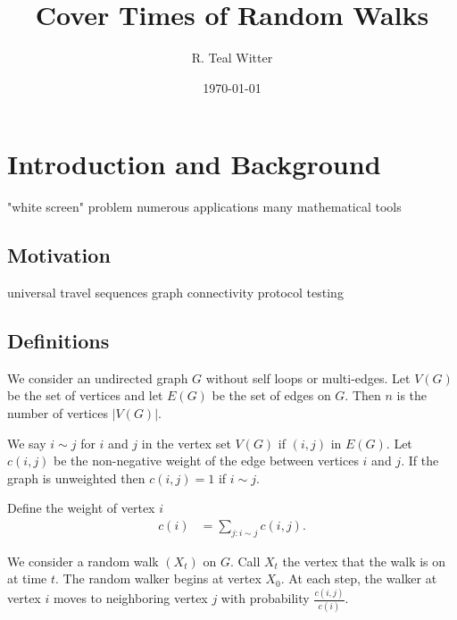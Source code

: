 \documentclass[12pt]{article}
\theoremstyle{definition}
\begin{document}
\title{Cover Times of Random Walks}


\author{R. Teal Witter}

\date{\today}



\maketitle


\newpage
\tableofcontents

\newpage
\section{Introduction and Background}

"white screen" problem
numerous applications
many mathematical tools

\subsection{Motivation}
universal travel sequences
graph connectivity
protocol testing

\subsection{Definitions}
We consider an undirected graph $G$ without self loops or multi-edges.
Let $V(G)$ be the set of vertices and let $E(G)$ be the set of edges on $G$.
Then $n$ is the number of vertices $|V(G)|$.

We say $i\sim j$ for $i$ and $j$ in the vertex set $V(G)$ if $(i,j)$ in $E(G)$.
Let $c(i,j)$ be the non-negative weight of the edge between vertices $i$ and $j$.
If the graph is unweighted then $c(i,j) = 1$ if $i \sim j$.

Define the weight of vertex $i$ 
\begin{align}
c(i) &= \sum_{j:i \sim j} c(i,j). \nonumber
\end{align}

We consider a random walk $(X_t)$ on $G$.
Call $X_t$ the vertex that the walk is on at time $t$.
The random walker begins at vertex $X_0$.
At each step, the walker at vertex $i$ moves to neighboring vertex
$j$ with probability $\frac{c(i,j)}{c(i)}$.
\end{document}
